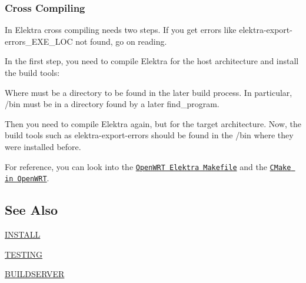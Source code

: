 \subsubsection*{Cross Compiling}

In Elektra cross compiling needs two steps. If you get errors like {\ttfamily elektra-\/export-\/errors\+\_\+\+E\+X\+E\+\_\+\+L\+OC} not found, go on reading.

In the first step, you need to compile Elektra for the host architecture and install the build tools\+:




Where {\ttfamily } must be a directory to be found in the later build process. In particular, {\ttfamily /bin} must be in a directory found by a later {\ttfamily find\+\_\+program}.

Then you need to compile Elektra again, but for the target architecture. Now, the build tools such as {\ttfamily elektra-\/export-\/errors} should be found in the {\ttfamily /bin} where they were installed before.

For reference, you can look into the \href{https://github.com/openwrt/packages/blob/master/libs/elektra/Makefile}{\tt Open\+W\+RT Elektra Makefile} and the \href{https://github.com/openwrt/openwrt/blob/master/include/cmake.mk}{\tt C\+Make in Open\+W\+RT}.

\subsection*{See Also}


\begin{DoxyItemize}
\item \hyperlink{doc_INSTALL_md}{I\+N\+S\+T\+A\+LL}
\item \hyperlink{doc_TESTING_md}{T\+E\+S\+T\+I\+NG}
\item \hyperlink{doc_BUILDSERVER_md}{B\+U\+I\+L\+D\+S\+E\+R\+V\+ER} 
\end{DoxyItemize}